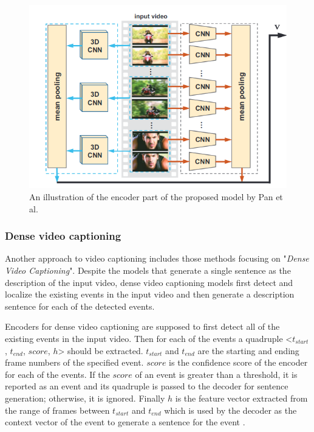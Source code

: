 \documentclass[preprint, 10pt]{elsarticle}
\begin{document}
		\begin{figure}[h]
			\centering
			\includegraphics[scale=0.5]{Imgs/3DCNN2.png}
			\caption{An illustration of the encoder part of the proposed model by Pan et al. \cite{pan2016jointly}}
			\label{fig:3dcnn2}
		\end{figure}
	
		\subsubsection{Dense video captioning}
		Another approach to video captioning includes those methods focusing on "\textit{Dense Video Captioning}". Despite the models that generate a single sentence as the description of the input video, dense video captioning models first detect and localize the existing events in the input video and then generate a description sentence for each of the detected events. 
		
		Encoders for dense video captioning are supposed to first detect all of the existing events in the input video. Then for each of the events a quadruple <$t_{start}$, $t_{end}$, $score$, $h$> should be extracted. $t_{start}$ and $t_{end}$ are the starting and ending frame numbers of the specified event. $score$ is the confidence score of the encoder for each of the events. If the $score$ of an event is greater than a threshold, it is reported as an event and its quadruple is passed to the decoder for sentence generation; otherwise, it is ignored. Finally $h$ is the feature vector extracted from the range of frames between $t_{start}$ and $t_{end}$ which is used by the decoder as the context vector of the event to generate a sentence for the event \cite{li2018jointly}. 
		
\end{document}
